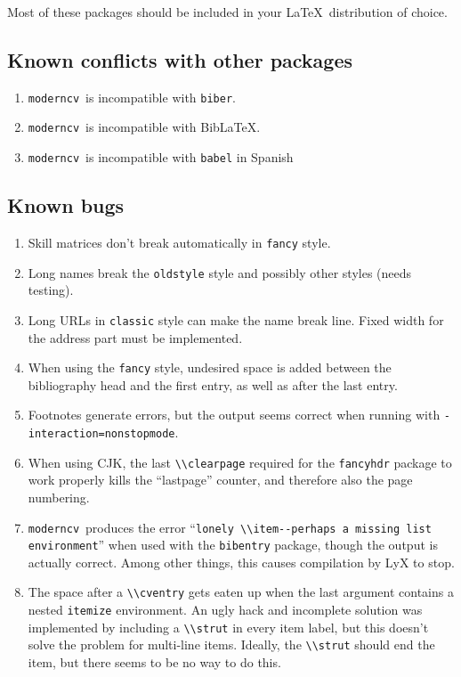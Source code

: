\documentclass[a4paper, 11pt]{article}
\newcommand{\code}[1]{\lstinline!#1!}
\newcommand{\moderncv}{\code{moderncv}}
\newcommand{\Moderncv}{\moderncv~}
\newcommand{\Latex}{\LaTeX~}
\newcommand{\biblatex}{BibLaTeX}
\begin{document}
Most of these packages should be included in your \Latex distribution of choice.

\subsection{Known conflicts with other packages}
\begin{enumerate}
  \item \Moderncv is incompatible with \code{biber}.
  \item \Moderncv is incompatible with \biblatex.
  \item \Moderncv is incompatible with \code{babel} in Spanish
\end{enumerate}

\subsection{Known bugs}
\begin{enumerate}
  \item Skill matrices don't break automatically in \texttt{fancy} style.
  \item Long names break the \texttt{oldstyle} style and possibly other styles (needs testing).
  \item Long URLs in \texttt{classic} style can make the name break line.
  Fixed width for the address part must be implemented.
  \item When using the \texttt{fancy} style, undesired space is added between the bibliography head and the first entry, as well as after the last entry.
  \item Footnotes generate errors, but the output seems correct when running with \code{-interaction=nonstopmode}.
  \item When using CJK, the last \code{\\clearpage} required for the \code{fancyhdr} package to work properly kills the ``lastpage'' counter, and therefore also the page numbering.
  \item \Moderncv produces the error ``\code{lonely \\item--perhaps a missing list environment}'' when used with the \code{bibentry} package, though the output is actually correct.
  Among other things, this causes compilation by LyX to stop.
  \item The space after a \code{\\cventry} gets eaten up when the last argument contains a nested \code{itemize} environment.
  An ugly hack and incomplete solution was implemented by including a \code{\\strut} in every item label, but this doesn't solve the problem for multi-line items.
  Ideally, the \code{\\strut} should end the item, but there seems to be no way to do this.
\end{enumerate}
\end{document}
